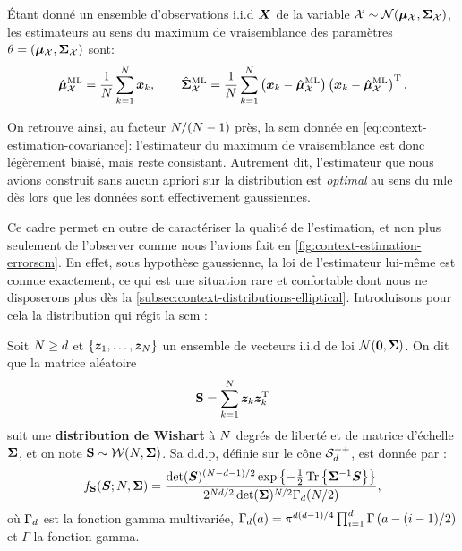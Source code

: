 \begin{proposition}
\label{prop:context-distributions-mlegaussian}
  \'Etant donné un ensemble d'observations i.i.d $\boldsymbol{X}$ de la variable $\mathcal{X}\sim\mathcal{N}(\boldsymbol{\mu}_{\mathcal{X}},\boldsymbol{\Sigma}_{\mathcal{X}})$, les estimateurs au sens du maximum de vraisemblance des paramètres $\theta=(\boldsymbol{\mu}_{\mathcal{X}},\boldsymbol{\Sigma}_{\mathcal{X}})$ sont:
  \begin{equation}
    \hat{\boldsymbol{\mu}}_{\mathcal{X}}^{\mathrm{ML}} = \frac{1}{N}\sum_{k=1}^{N}\boldsymbol{x}_k,
    \qquad
    \hat{\boldsymbol{\Sigma}}_{\mathcal{X}}^{\mathrm{ML}} = \frac{1}{N}\sum_{k=1}^{N}\left(\boldsymbol{x}_k-\hat{\boldsymbol{\mu}}_{\mathcal{X}}^{\mathrm{ML}}\right)\left(\boldsymbol{x}_k-\hat{\boldsymbol{\mu}}_{\mathcal{X}}^{\mathrm{ML}}\right)^{\mathrm{T}}.
    \label{eq:context-distributions-mlegaussian}
  \end{equation}
\end{proposition}


\begin{remark}
  On retrouve ainsi, au facteur $N/(N-1)$ près, la scm donnée en \cref{eq:context-estimation-covariance}: l'estimateur du maximum de vraisemblance est donc légèrement biaisé, mais reste consistant. Autrement dit, l'estimateur que nous avions construit sans aucun apriori sur la distribution est \emph{optimal} au sens du mle dès lors que les données sont effectivement gaussiennes.
\end{remark}

Ce cadre permet en outre de caractériser la qualité de l'estimation, et non plus seulement de l'observer comme nous l'avions fait en \cref{fig:context-estimation-errorscm}. En effet, sous hypothèse gaussienne, la loi de l'estimateur lui-même est connue exactement, ce qui est une situation rare et confortable dont nous ne disposerons plus dès la \cref{subsec:context-distributions-elliptical}. Introduisons pour cela la distribution qui régit la scm :

\begin{definition}
\label{def:context-distributions-wishart}
  Soit $N\geq d$ et $\{\boldsymbol{z}_1,\dots,\boldsymbol{z}_N\}$ un ensemble de vecteurs i.i.d de loi $\mathcal{N}(\boldsymbol{0},\boldsymbol{\Sigma})$. On dit que la matrice aléatoire
  \begin{equation}
    \mathbf{S} = \sum_{k=1}^{N}\boldsymbol{z}_k\boldsymbol{z}_k^{\mathrm{T}}
    \label{eq:context-distributions-wishartdef}
  \end{equation}
  suit une \textbf{distribution de Wishart} à $N$ degrés de liberté et de matrice d'échelle $\boldsymbol{\Sigma}$, et on note $\mathbf{S}\sim\mathcal{W}(N,\boldsymbol{\Sigma})$. Sa d.d.p, définie sur le cône $\mathcal{S}_{d}^{++}$, est donnée par :
\begin{equation}
  f_{\mathbf{S}}(\boldsymbol{S}; N, \boldsymbol{\Sigma})
  =
  \frac{
    \operatorname{\operatorname{det}}(\boldsymbol{S})^{(N-d-1)/2}
    \exp\left\{-\frac{1}{2}\operatorname{\operatorname{Tr}}\left\{{\boldsymbol{\Sigma}}^{-1}\boldsymbol{S}\right\}\right\}
  }{
    2^{Nd/2}\operatorname{\operatorname{det}}(\boldsymbol{\Sigma})^{N/2}\Gamma_d(N/2)
  },
  \label{eq:context-distributions-wishartpdf}
\end{equation}
où $\Gamma_d$ est la fonction gamma multivariée, $\Gamma_d(a) = \pi^{d(d-1)/4}\prod_{i=1}^{d}\Gamma\left(a-(i-1)/2\right)$ et $\Gamma$ la fonction gamma.
\end{definition}

